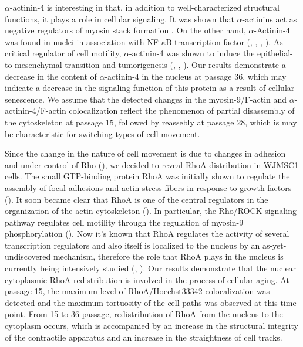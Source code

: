 \documentclass[alpha-refs]{wiley-article}
\begin{document}
$\alpha$-actinin-4 is interesting in that, in addition to well-characterized structural functions, it plays a role in cellular signaling.
It was shown that $\alpha$-actinins act as negative regulators of myosin stack formation \cite{hu2019reciprocal}.
On the other hand, $\alpha$-Actinin-4 was found in nuclei in association with NF-$\kappa$B transcription factor (\cite{bolshakova2007extra}, \cite{babakov2008rela}, \cite{khotin2009analysis}, \cite{lomert2018co}).
As critical regulator of cell motility, $\alpha$-actinin-4 was shown to induce the epithelial-to-mesenchymal transition and tumorigenesis
(\cite{barbolina2008motility}, \cite{hsu2013alpha}, \cite{an2016alpha}).
Our results demonstrate a decrease in the content of $\alpha$-actinin-4 in the nucleus at passage 36, which may indicate a decrease in the signaling function of this protein as a result of cellular senescence.
We assume that the detected changes in the myosin-9/F-actin and $\alpha$-actinin-4/F-actin colocalization reflect the phenomenon of partial disassembly of the cytoskeleton at passage 15, followed by reassebly at passage 28, which is may be characteristic for switching types of cell movement.

Since the change in the nature of cell movement is due to changes in adhesion and under control of Rho (\cite{huveneers2009adhesion}), we decided to reveal RhoA distribution in WJMSC1 cells.
The small GTP-binding protein RhoA was initially shown to regulate the assembly of focal adhesions and actin stress fibers in response to growth factors (\cite{ridley1992small}).
It soon became clear that RhoA is one of the central regulators in the organization of the actin cytoskeleton (\cite{burridge2004rho}).
In particular, the Rho/ROCK signaling pathway regulates cell motility through the regulation of myosin-9 phosphorylation (\cite{elliott2015myosin}).
Now it’s known that RhoA regulates the activity of several transcription regulators and also itself is localized to the nucleus by an as-yet-undiscovered mechanism, therefore the role that RhoA plays in the nucleus is currently being intensively studied (\cite{guilluy2011analysis}, \cite{kim2018regulation}).
Our results demonstrate that the nuclear cytoplasmic RhoA redistribution is involved in the process of cellular aging.
At passage 15, the maximum level of RhoA/Hoechst33342 colocalization was detected and the maximum tortuosity of the cell paths was observed at this time point.
From 15 to 36 passage, redistribution of RhoA from the nucleus to the cytoplasm occurs, which is accompanied by an increase in the structural integrity of the contractile apparatus and an increase in the straightness of cell tracks.
\end{document}
